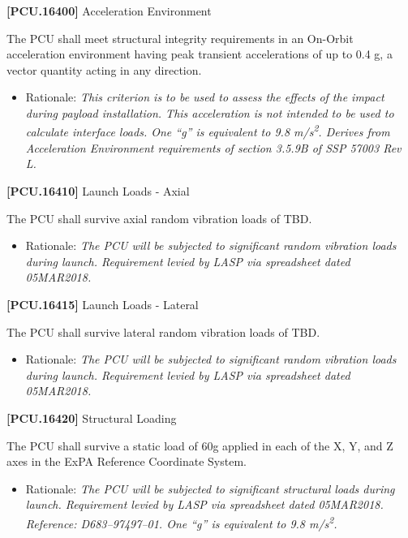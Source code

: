 \textbf{[PCU.16400]} Acceleration Environment

The \gls{PCU} shall meet structural integrity requirements in an On-Orbit acceleration environment having peak transient accelerations of up to 0.4 g, a vector quantity acting in any direction.

\begin{itemize}
\item{} Rationale: \emph{This criterion is to be used to assess the effects of the impact during payload installation. This acceleration is not intended to be used to calculate interface loads. One ``g'' is equivalent to 9.8 m\slash s\textsuperscript{2}. Derives from Acceleration Environment requirements of section 3.5.9B of SSP 57003 Rev L.}

\end{itemize}

\textbf{[PCU.16410]} Launch Loads - Axial

The \gls{PCU} shall survive axial random vibration loads of TBD\label{tbx_11}.

\begin{itemize}
\item{} Rationale: \emph{The PCU will be subjected to significant random vibration loads during launch. Requirement levied by LASP via spreadsheet dated 05MAR2018.}

\end{itemize}

\textbf{[PCU.16415]} Launch Loads - Lateral

The \gls{PCU} shall survive lateral random vibration loads of TBD\label{tbx_12}.

\begin{itemize}
\item{} Rationale: \emph{The PCU will be subjected to significant random vibration loads during launch. Requirement levied by LASP via spreadsheet dated 05MAR2018.}

\end{itemize}

\textbf{[PCU.16420]} Structural Loading

The \gls{PCU} shall survive a static load of 60g applied in each of the X, Y, and Z axes in the \gls{ExPA} Reference Coordinate System.

\begin{itemize}
\item{} Rationale: \emph{The PCU will be subjected to significant structural loads during launch. Requirement levied by LASP via spreadsheet dated 05MAR2018. Reference: D683--97497--01. One ``g'' is equivalent to 9.8 m\slash s\textsuperscript{2}.}

\end{itemize}

